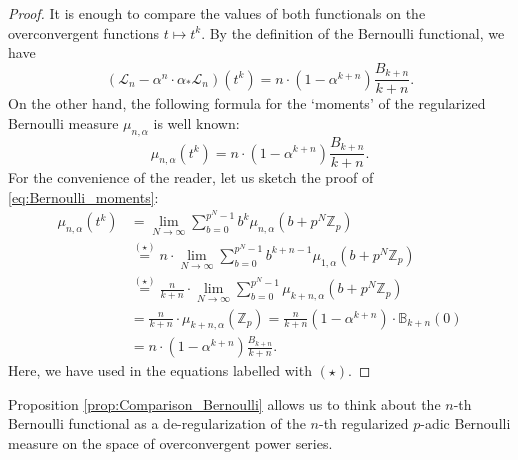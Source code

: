 \documentclass[12pt]{article}
\numberwithin{equation}{section}
\begin{document}
\begin{proof}
It is enough to compare the values of both functionals on the overconvergent functions $t\mapsto t^k$. By the definition of the Bernoulli functional, we have
\[
	(\mathcal{L}_n -\alpha^n\cdot \alpha_*\mathcal{L}_{n})(t^k)=n\cdot (1-\alpha^{k+n})\frac{B_{k+n}}{k+n}.
\]
On the other hand, the following formula for the `moments' of the regularized Bernoulli measure $\mu_{n,\alpha}$ is well known:
\begin{equation}\label{eq:Bernoulli_moments}
	\mu_{n,\alpha}(t^k)=n\cdot (1-\alpha^{k+n})\frac{B_{k+n}}{k+n}.
\end{equation}
For the convenience of the reader, let us sketch the proof of \eqref{eq:Bernoulli_moments}:
\begin{align*}
	\mu_{n,\alpha}(t^k) &= \lim_{N\to \infty} \sum_{b=0}^{p^N-1} b^k \mu_{n,\alpha}(b+p^N\mathbb{Z}_p)\\
	&\stackrel{(\star)}{=} n \cdot \lim_{N\to \infty} \sum_{b=0}^{p^N-1} b^{k+n-1} \mu_{1,\alpha}(b+p^N\mathbb{Z}_p)\\
	&\stackrel{(\star)}{=} \frac{n}{k+n} \cdot \lim_{N\to \infty} \sum_{b=0}^{p^N-1} \mu_{k+n,\alpha}(b+p^N\mathbb{Z}_p)\\
	&= \frac{n}{k+n} \cdot \mu_{k+n,\alpha}(\mathbb{Z}_p)=\frac{n}{k+n} (1-\alpha^{k+n})\cdot \mathbb{B}_{k+n}(0)\\
	&= n\cdot (1-\alpha^{k+n})\frac{B_{k+n}}{k+n}.
\end{align*}
Here, we have used \cite[II, Thm. 5]{Kob84} in the equations labelled with $(\star)$.
\end{proof}

Proposition \ref{prop:Comparison_Bernoulli} allows us to think about the $n$-th Bernoulli functional as a de-regularization of the $n$-th regularized $p$-adic Bernoulli measure on the space of overconvergent power series.
\end{document}
